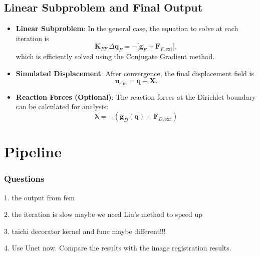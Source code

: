 \documentclass{article}
\begin{document}
\subsection{Linear Subproblem and Final Output}
\begin{itemize}
    \item \textbf{Linear Subproblem}: In the general case, the equation to solve at each iteration is
    \[
        \mathbf{K}_{FF}\,\Delta\mathbf{q}_F = -\bigl[\mathbf{g}_F + \mathbf{F}_{F,\text{ext}}\bigr],
    \]
    which is efficiently solved using the Conjugate Gradient method.

    \item \textbf{Simulated Displacement}: After convergence, the final displacement field is
    \[
       \mathbf{u}_{\text{sim}} = \mathbf{q} - \mathbf{X}.
    \]

    \item \textbf{Reaction Forces (Optional)}: The reaction forces at the Dirichlet boundary can be calculated for analysis:
    \[
       \boldsymbol{\lambda} = -(\mathbf{g}_D(\mathbf{q}) + \mathbf{F}_{D,\text{ext}})
    \]
\end{itemize}

\section{Pipeline}


\subsubsection{Questions}
1. the output from fem 

2. the iteration is slow maybe we need Liu's method to speed up

3. taichi decorator kernel and func maybe different!!!

4. Use Unet now. Compare the results with the image registration results.
 
\end{document}

